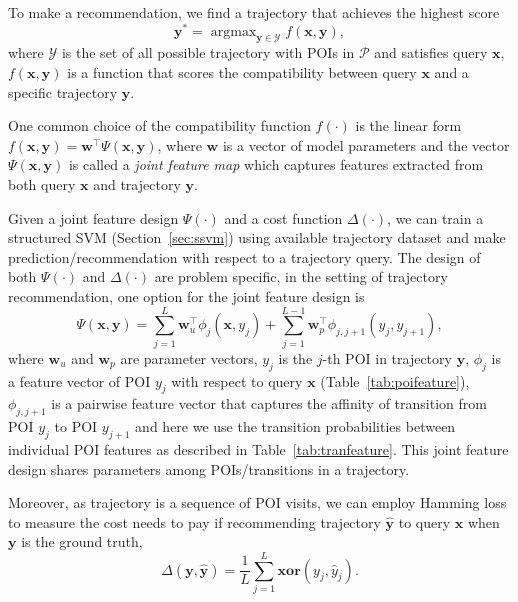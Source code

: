 \documentclass[9pt]{extarticle}
\DeclareMathOperator*{\argmax}{argmax}
\begin{document}
To make a recommendation, we find a trajectory that achieves the highest score
\begin{equation*}
\mathbf{y}^* = \argmax_{\mathbf{y} \in \mathcal{Y}} f(\mathbf{x}, \mathbf{y}),
\end{equation*}
where $\mathcal{Y}$ is the set of all possible trajectory with POIs in $\mathcal{P}$ and satisfies query $\mathbf{x}$,
$f(\mathbf{x}, \mathbf{y})$ is a function that scores the compatibility between query $\mathbf{x}$ and a specific trajectory $\mathbf{y}$.

One common choice of the compatibility function $f(\cdot)$ is the linear form
$f(\mathbf{x}, \mathbf{y}) = \mathbf{w}^\top \Psi(\mathbf{x}, \mathbf{y})$,
where $\mathbf{w}$ is a vector of model parameters and 
the vector $\Psi(\mathbf{x}, \mathbf{y})$ is called a \emph{joint feature map} 
which captures features extracted from both query $\mathbf{x}$ and trajectory $\mathbf{y}$.

Given a joint feature design $\Psi(\cdot)$ and a cost function $\Delta(\cdot)$,
we can train a structured SVM (Section~\ref{sec:ssvm}) using available trajectory dataset and 
make prediction/recommendation with respect to a trajectory query.
The design of both $\Psi(\cdot)$ and $\Delta(\cdot)$ are problem specific,
in the setting of trajectory recommendation, one option for the joint feature design is
\begin{equation*}
\Psi(\mathbf{x}, \mathbf{y}) = \sum_{j=1}^L \mathbf{w}_u^\top \phi_j(\mathbf{x}, y_j) +
                               \sum_{j=1}^{L-1} \mathbf{w}_p^\top \phi_{j, j+1}(y_j, y_{j+1}),
\end{equation*}
where $\mathbf{w}_u$ and $\mathbf{w}_p$ are parameter vectors,
$y_j$ is the $j$-th POI in trajectory $\mathbf{y}$, 
$\phi_j$ is a feature vector of POI $y_j$ with respect to query $\mathbf{x}$ (Table~\ref{tab:poifeature}),
$\phi_{j,j+1}$ is a pairwise feature vector that captures the affinity of transition from POI $y_j$ to POI $y_{j+1}$ and
here we use the transition probabilities between individual POI features as described in Table~\ref{tab:tranfeature}.
This joint feature design shares parameters among POIs/transitions in a trajectory.

Moreover, as trajectory is a sequence of POI visits, we can employ Hamming loss to measure the cost needs to pay
if recommending trajectory $\hat{\mathbf{y}}$ to query $\mathbf{x}$ when $\mathbf{y}$ is the ground truth,
\begin{equation*}
\Delta(\mathbf{y}, \hat{\mathbf{y}}) = \frac{1}{L} \sum_{j=1}^L \mathbf{xor} (y_j, \hat{y}_j).
\end{equation*}
\end{document}
